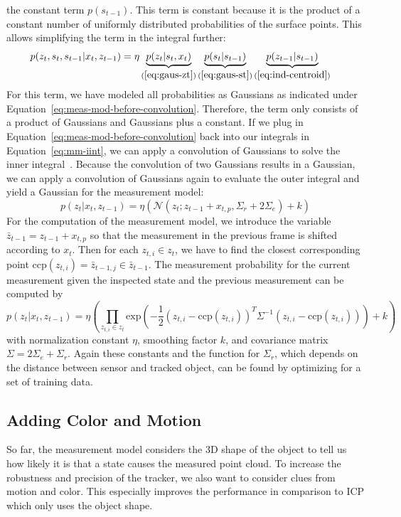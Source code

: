 \documentclass[twoside,a4paper,article]{combine}
\begin{document}
the constant term $p(s_{t-1})$. This term is constant because it is
the product of a constant number of uniformly distributed
probabilities of the surface points. This allows simplifying the
term in the integral further:
\begin{align}
\label{eq:meas-mod-before-convolution}
p(z_t,s_t,s_{t-1}|x_t,z_{t-1})
&=\eta\underbrace{p(z_t|s_t,x_t)}_{(\ref{eq:gaus-zt})}\underbrace{p(s_t|s_{t-1})}_{(\ref{eq:gaus-st})}\underbrace{p(z_{t-1}|s_{t-1})}_{(\ref{eq:ind-centroid})}
\end{align}
For this term, we have modeled all probabilities as Gaussians as
indicated under Equation~\ref{eq:meas-mod-before-convolution}.
Therefore, the term only consists of a product of Gaussians and
Gaussians plus a constant. If we plug in
Equation~\ref{eq:meas-mod-before-convolution} back into our integrals
in Equation~\ref{eq:mm-iint}, we can apply a convolution of Gaussians
to solve the inner integral~\cite{prob-rob}. Because the convolution of two Gaussians
results in a Gaussian, we can apply a convolution of Gaussians again
to evaluate the outer integral and yield a Gaussian for the
measurement model:
\begin{equation}
\label{eq:gaus-mm}
p(z_t|x_t,z_{t-1}) =
\eta(\mathcal{N}(z_t;z_{t-1}+x_{t,p},\Sigma_r+2\Sigma_e)+k)
\end{equation}
For the computation of the measurement model, we introduce the
variable $\bar{z}_{t-1}=z_{t-1}+x_{t,p}$ so that the measurement in
the previous frame is shifted according to $x_t$. Then for each
$z_{t,i}\in z_t$, we have to find the closest corresponding point
$\mathrm{ccp}(z_{t,i}) = \bar{z}_{t-1,j}\in \bar{z}_{t-1}$. The measurement
probability for the current measurement given the inspected state and
the previous measurement can be computed by
\begin{equation}
\label{eq:mm-compute}
p(z_t|x_t,z_{t-1}) =
\eta\left(\prod_{z_{t,i}\in z_t}
\mathrm{exp}\left(-\frac{1}{2}(z_{t,i}-\mathrm{ccp}(z_{t,i}))^T\Sigma^{-1}(z_{t,i}-\mathrm{ccp}(z_{t,i}))\right)+k\right)
\end{equation}
with normalization constant $\eta$, smoothing factor $k$, and
covariance matrix $\Sigma = 2\Sigma_e+\Sigma_r$. Again these constants
and the function for $\Sigma_r$, which depends on the distance between
sensor and tracked object, can be found by optimizing for a set of
training data.

\subsection{Adding Color and Motion}
\label{sub:adding-color}
So far, the measurement model considers the 3D shape of the object to
tell us how likely it is that a state causes the measured point
cloud. To increase the robustness and precision of the tracker, we
also want to consider clues from motion and color. This especially
improves the performance in comparison to ICP which only uses the
object shape.
\end{document}

